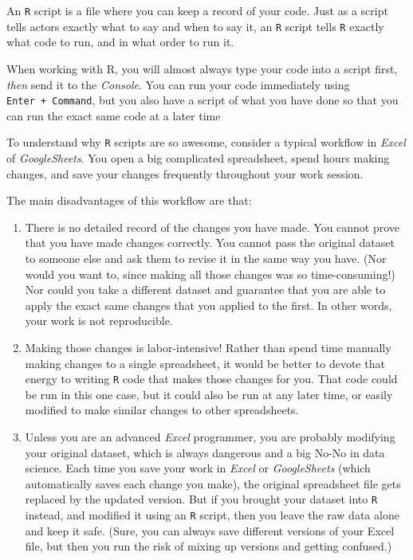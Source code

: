 \documentclass[
]{book}
\begin{document}
An \texttt{R} script is a file where you can keep a record of your code. Just as a script tells actors exactly what to say and when to say it, an \texttt{R} script tells \texttt{R} exactly what code to run, and in what order to run it.

When working with R, you will almost always type your code into a script first, \emph{then} send it to the \emph{Console}. You can run your code immediately using \texttt{Enter\ +\ Command}, but you also have a script of what you have done so that you can run the exact same code at a later time

To understand why \texttt{R} scripts are so awesome, consider a typical workflow in \emph{Excel} of \emph{GoogleSheets}. You open a big complicated spreadsheet, spend hours making changes, and save your changes frequently throughout your work session.

The main disadvantages of this workflow are that:

\begin{enumerate}
\def\labelenumi{\arabic{enumi}.}
\item
  There is no detailed record of the changes you have made. You cannot prove that you have made changes correctly. You cannot pass the original dataset to someone else and ask them to revise it in the same way you have. (Nor would you want to, since making all those changes was so time-consuming!) Nor could you take a different dataset and guarantee that you are able to apply the exact same changes that you applied to the first. In other words, your work is not reproducible.
\item
  Making those changes is labor-intensive! Rather than spend time manually making changes to a single spreadsheet, it would be better to devote that energy to writing \texttt{R} code that makes those changes for you. That code could be run in this one case, but it could also be run at any later time, or easily modified to make similar changes to other spreadsheets.
\item
  Unless you are an advanced \emph{Excel} programmer, you are probably modifying your original dataset, which is always dangerous and a big No-No in data science. Each time you save your work in \emph{Excel} or \emph{GoogleSheets} (which automatically saves each change you make), the original spreadsheet file gets replaced by the updated version. But if you brought your dataset into \texttt{R} instead, and modified it using an \texttt{R} script, then you leave the raw data alone and keep it safe. (Sure, you can always save different versions of your Excel file, but then you run the risk of mixing up versions and getting confused.)
\end{enumerate}
\end{document}
